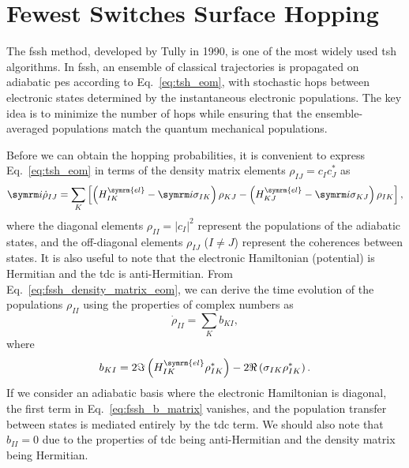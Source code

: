 \section{Fewest Switches Surface Hopping}\label{sec:fewest_switches}
The \gls{fssh} method, developed by Tully in 1990,\supercite{10.1063/1.459170} is one of the most widely used \gls{tsh} algorithms. In \gls{fssh}, an ensemble of classical trajectories is propagated on adiabatic \gls{pes} according to Eq.~\eqref{eq:tsh_eom}, with stochastic hops between electronic states determined by the instantaneous electronic populations. The key idea is to minimize the number of hops while ensuring that the ensemble-averaged populations match the quantum mechanical populations.

Before we can obtain the hopping probabilities, it is convenient to express Eq.~\eqref{eq:tsh_eom} in terms of the density matrix elements $\rho_{IJ}=c_I c_J^\ast$ as
\begin{equation}\label{eq:fssh_density_matrix_eom}
\i\dot\rho_{IJ}=\sum_K\left[\left(H_{IK}^{\symrm{el}}-\i\sigma_{IK}\right)\rho_{KJ}-\left(H_{KJ}^{\symrm{el}}-\i\sigma_{KJ}\right)\rho_{IK}\right],
\end{equation}
where the diagonal elements $\rho_{II}=\lvert c_I\rvert^2$ represent the populations of the adiabatic states, and the off-diagonal elements $\rho_{IJ}$ ($I\neq J$) represent the coherences between states. It is also useful to note that the electronic Hamiltonian (potential) is Hermitian and the \gls{tdc} is anti-Hermitian. From Eq.~\eqref{eq:fssh_density_matrix_eom}, we can derive the time evolution of the populations $\rho_{II}$ using the properties of complex numbers as
\begin{equation}\label{eq:fssh_population_eom}
\dot\rho_{II}=\sum_K b_{KI},
\end{equation}
where
\begin{equation}\label{eq:fssh_b_matrix}
b_{KI}=2\Im\left(H_{IK}^{\symrm{el}}\rho_{IK}^\ast\right)-2\Re\left(\sigma_{IK}\rho_{IK}^\ast\right).
\end{equation}
If we consider an adiabatic basis where the electronic Hamiltonian is diagonal, the first term in Eq.~\eqref{eq:fssh_b_matrix} vanishes, and the population transfer between states is mediated entirely by the \gls{tdc} term. We should also note that $b_{II}=0$ due to the properties of \gls{tdc} being anti-Hermitian and the density matrix being Hermitian.


